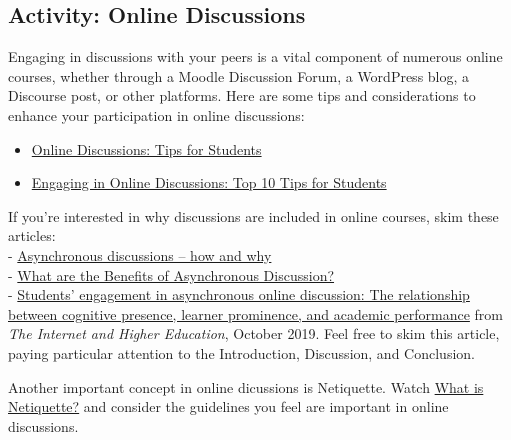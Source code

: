 \documentclass[
]{book}
\providecommand{\tightlist}{%
  \setlength{\itemsep}{0pt}\setlength{\parskip}{0pt}}
\theoremstyle{definition}
\theoremstyle{definition}
\theoremstyle{definition}
\theoremstyle{definition}
\theoremstyle{remark}
\begin{document}
\hypertarget{activity-online-discussions}{%
\subsection*{Activity: Online Discussions}\label{activity-online-discussions}}

\begin{reflect}
Engaging in discussions with your peers is a vital component of numerous online courses, whether through a Moodle Discussion Forum, a WordPress blog, a Discourse post, or other platforms. Here are some tips and considerations to enhance your participation in online discussions:

\begin{itemize}
\tightlist
\item
  \href{https://uwaterloo.ca/centre-for-teaching-excellence/catalogs/tip-sheets/online-discussions-tips-students}{Online Discussions: Tips for Students}\\
\item
  \href{https://blogs.qub.ac.uk/digitaldiscovery/2020/07/21/engaging-in-online-discussions-tips-for-students/}{Engaging in Online Discussions: Top 10 Tips for Students}
\end{itemize}

If you're interested in why discussions are included in online courses, skim these articles:\\
- \href{https://www.timeshighereducation.com/campus/asynchronous-discussions-how-and-why}{Asynchronous discussions -- how and why}\\
- \href{https://adjunctworld.com/blog/what-are-the-benefits-of-asynchronous-discussion/}{What are the Benefits of Asynchronous Discussion?}\\
- \href{https://twu.idm.oclc.org/login?url=https://search.ebscohost.com/login.aspx?direct=true\&db=edselp\&AN=S1096751619304105\&site=eds-live\&scope=site}{Students' engagement in asynchronous online discussion: The relationship between cognitive presence, learner prominence, and academic performance} from \emph{The Internet and Higher Education}, October 2019. Feel free to skim this article, paying particular attention to the Introduction, Discussion, and Conclusion.

Another important concept in online dicussions is Netiquette. Watch \href{https://www.youtube.com/watch?v=CWbtbycHZok}{What is Netiquette?} and consider the guidelines you feel are important in online discussions.
\end{reflect}
\end{document}
